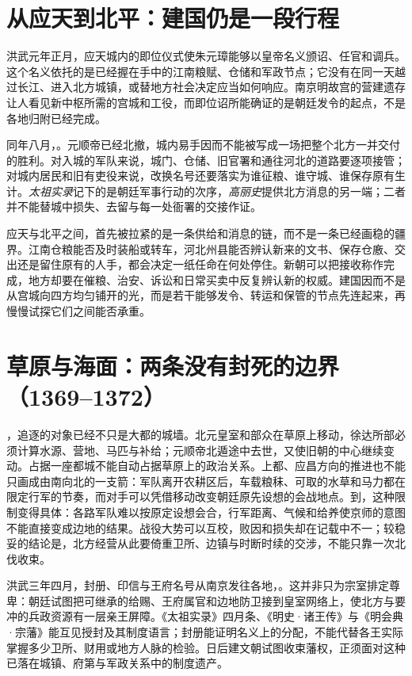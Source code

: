 \section{从应天到北平：建国仍是一段行程}

洪武元年正月，应天城内的即位仪式使朱元璋能够以皇帝名义颁诏、任官和调兵。这个名义依托的是已经握在手中的江南粮赋、仓储和军政节点；它没有在同一天越过长江、进入北方城镇，或替地方社会决定应当如何响应。南京明故宫的营建遗存让人看见新中枢所需的宫城和工役，而即位诏所能确证的是朝廷发令的起点，不是各地归附已经完成。

同年八月，。元顺帝已经北撤，城内易手因而不能被写成一场把整个北方一并交付的胜利。对入城的军队来说，城门、仓储、旧官署和通往河北的道路要逐项接管；对城内居民和旧有吏役来说，改换名号还要落实为谁征粮、谁守城、谁保存原有生计。\textit{太祖实录}记下的是朝廷军事行动的次序，\textit{高丽史}提供北方消息的另一端；二者并不能替城中损失、去留与每一处衙署的交接作证。

应天与北平之间，首先被拉紧的是一条供给和消息的链，而不是一条已经画稳的疆界。江南仓粮能否及时装船或转车，河北州县能否辨认新来的文书、保存仓廒、交出还是留住原有的人手，都会决定一纸任命在何处停住。新朝可以把接收称作完成，地方却要在催粮、治安、诉讼和日常买卖中反复辨认新的权威。建国因而不是从宫城向四方均匀铺开的光，而是若干能够发令、转运和保管的节点先连起来，再慢慢试探它们之间能否承重。

\section{草原与海面：两条没有封死的边界（1369--1372）}

，追逐的对象已经不只是大都的城墙。北元皇室和部众在草原上移动，徐达所部必须计算水源、营地、马匹与补给；元顺帝北遁途中去世，又使旧朝的中心继续变动。占据一座都城不能自动占据草原上的政治关系。上都、应昌方向的推进也不能只画成由南向北的一支箭：军队离开农耕区后，车载粮秣、可取的水草和马力都在限定行军的节奏，而对手可以凭借移动改变朝廷原先设想的会战地点。到，这种限制变得具体：各路军队难以按原定设想会合，行军距离、气候和给养使京师的意图不能直接变成边地的结果。战役大势可以互校，败因和损失却在记载中不一；较稳妥的结论是，北方经营从此要倚重卫所、边镇与时断时续的交涉，不能只靠一次北伐收束。

洪武三年四月，封册、印信与王府名号从南京发往各地，。这并非只为宗室排定尊卑：朝廷试图把可继承的给赐、王府属官和边地防卫接到皇室网络上，使北方与要冲的兵政资源有一层亲王屏障。《太祖实录》四月条、《明史·诸王传》与《明会典·宗藩》能互见授封及其制度语言；封册能证明名义上的分配，不能代替各王实际掌握多少卫所、财用或地方人脉的检验。日后建文朝试图收束藩权，正须面对这种已落在城镇、府第与军政关系中的制度遗产。

